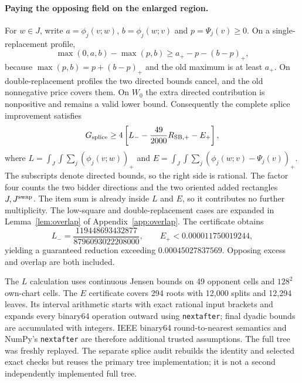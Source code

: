 \paragraph{Paying the opposing field on the enlarged region.}
For $w\in J$, write $a=\phi_j(v;w)$, $b=\phi_j(w;v)$ and
$p=\Psi_j(v)\ge0$. On a single-replacement profile,
\[
 \max(0,a,b)-\max(p,b)
 \ge a_+-p-(b-p)_+,
\]
because $\max(p,b)=p+(b-p)_+$ and the old maximum is at least $a_+$.
On double-replacement profiles the two directed
bounds cancel, and the old nonnegative price covers them. On $W_0$
the extra directed contribution is nonpositive and remains a valid
lower bound. Consequently the complete splice improvement satisfies
\begin{equation}\label{eq:v5-splice-gain}
 G_{\rm splice}\ge4\left[L_- -\frac{49}{2000}R_{{\rm SB},+}-E_+\right],
\end{equation}
where $L=\int_J\int\sum_j(\phi_j(v;w))_+$ and
$E=\int_J\int\sum_j(\phi_j(w;v)-\Psi_j(v))_+$.
The subscripts denote directed bounds, so the right side is rational.
The factor four counts the two bidder directions and the two oriented
added rectangles $J,J^{\rm swap}$. The item sum is already inside $L$
and $E$, so it contributes no further multiplicity. The low-square and
double-replacement cases are expanded in Lemma~\ref{lem:overlap} of Appendix~\ref{app:overlap}.
The certificate obtains
\[
 L_-=\frac{119448693432877}{8796093022208000},\qquad
 E_+<0.000011750019244,
\]
yielding a guaranteed reduction exceeding $0.00045027837569$. Opposing excess and overlap are both included.

The $L$ calculation uses continuous Jensen bounds on 49 opponent cells
and $128^2$ own-chart cells. The $E$ certificate covers 294 roots with
12,000 splits and 12,294 leaves. Its interval arithmetic starts with
exact rational input brackets and expands every binary64 operation
outward using \texttt{nextafter}; final dyadic bounds are accumulated
with integers. IEEE binary64 round-to-nearest semantics and NumPy's
\texttt{nextafter} are therefore additional trusted assumptions.
The full tree was freshly replayed. The separate splice audit rebuilds
the identity and selected exact checks but reuses the primary tree
implementation; it is not a second independently implemented full tree.

